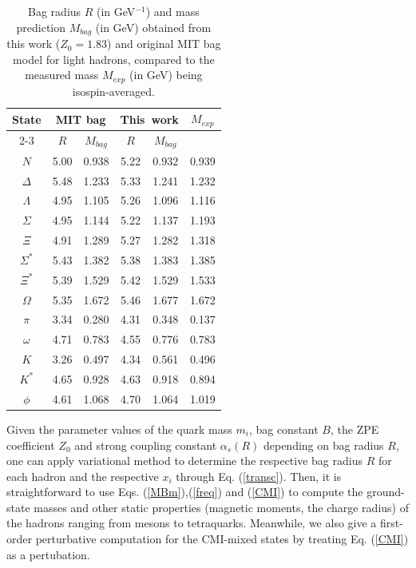 \documentclass[prt,twocolumn,floatfix,nofootinbib]{revtex4}
\begin{document}
\renewcommand{\tabcolsep}{0.39cm}
\renewcommand{\arraystretch}{1.3}
\begin{table}[!htbp]
    \caption{Bag radius $R$ (in GeV$^{-1}$) and mass prediction $M_{bag}$ (in GeV) obtained from this work ($Z_{0}=1.83$) and original MIT bag model for light hadrons, compared to the measured mass $M_{exp}$ (in GeV) being isospin-averaged.}
    \label{tab:lighthadron}
    \begin{tabular}{cccccc}
        \hline\hline
        \multirow{2}{*}{State} & \multicolumn{2}{c}{MIT bag\cite{Johnson:1975zp}} & \multicolumn{2}{c}{\rm This\ work} & \multirow{2}{*}{$M_{exp}$} \\
        \cline{2-3} \cline{4-5}
        & $R$ & $M_{bag}$ & $R$ & $M_{bag}$ \\ \hline
        $N$               &5.00      &0.938      &5.22      &0.932      &0.939  \\
        $\Delta$          &5.48      &1.233      &5.33      &1.241      &1.232  \\
        $\Lambda$         &4.95      &1.105      &5.26      &1.096      &1.116  \\
        $\Sigma$          &4.95      &1.144      &5.22      &1.137      &1.193  \\
        $\Xi$             &4.91      &1.289      &5.27      &1.282      &1.318  \\
        $\Sigma^{\ast}$   &5.43      &1.382      &5.38      &1.383      &1.385  \\
        $\Xi^{\ast}$      &5.39      &1.529      &5.42      &1.529      &1.533  \\
        $\Omega$          &5.35      &1.672      &5.46      &1.677      &1.672  \\
        $\pi$             &3.34      &0.280      &4.31      &0.348      &0.137  \\
        $\omega$          &4.71      &0.783      &4.55      &0.776      &0.783  \\
        $K$               &3.26      &0.497      &4.34      &0.561      &0.496  \\
        $K^{\ast}$        &4.65      &0.928      &4.63      &0.918      &0.894  \\
        $\phi$            &4.61      &1.068      &4.70      &1.064      &1.019  \\
        \hline\hline
    \end{tabular}
\end{table}

Given the parameter values of the quark mass $m_{i}$, bag constant $B$, the ZPE coefficient $Z_{0}$ and strong coupling constant $\alpha_{s}(R)$ depending on bag radius $R$, one can apply variational method to determine the respective bag radius $R$ for each hadron and the respective $x_{i}$ through Eq. (\ref{transc}). Then, it is straightforward to use Eqs. (\ref{MBm}),(\ref{freq}) and (\ref{CMI}) to compute the ground-state masses and other static properties (magnetic moments, the charge radius) of the hadrons ranging from mesons to tetraquarks. Meanwhile, we also give a first-order perturbative computation for the CMI-mixed states by treating Eq. (\ref{CMI}) as a pertubation.
\end{document}
